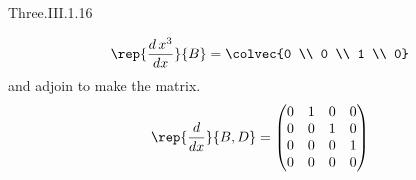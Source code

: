 \begin{ans}{Three.III.1.16}
\begin{exparts*}
\begin{equation*}
          \rep{\frac{d\,x^3}{dx}}{B}=\colvec{0 \\ 0 \\ 1 \\ 0}
        \end{equation*}
        and adjoin to make the matrix.
        \begin{equation*}
          \rep{\frac{d}{dx}}{B,D}=
          \begin{pmatrix}
            0  &1  &0  &0  \\
            0  &0  &1  &0  \\
            0  &0  &0  &1  \\
            0  &0  &0  &0
          \end{pmatrix}
        \end{equation*}
      \end{exparts*}
    
\end{ans}
